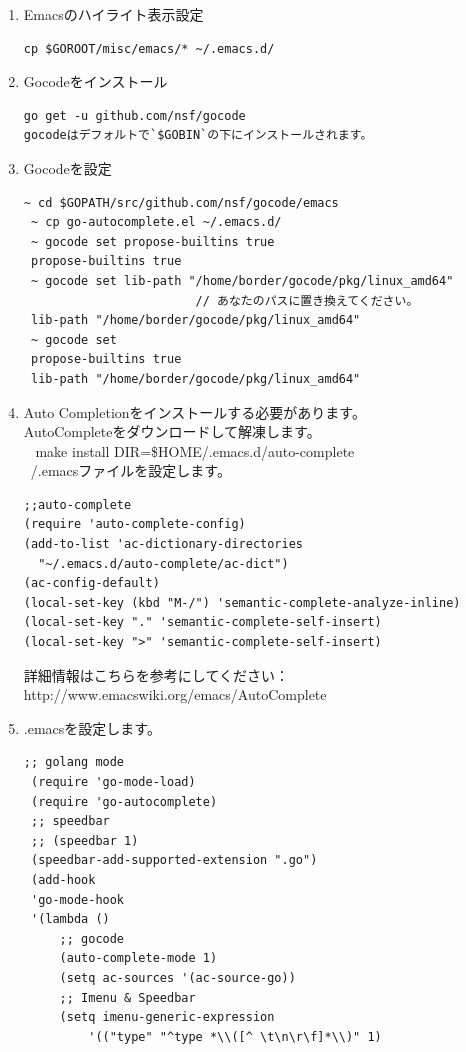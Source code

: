 \begin{enumerate}
\item Emacsのハイライト表示設定
\begin{lstlisting}[numbers=none]
cp $GOROOT/misc/emacs/* ~/.emacs.d/
\end{lstlisting}
\item Gocodeをインストール
\begin{lstlisting}[numbers=none]
go get -u github.com/nsf/gocode
gocodeはデフォルトで`$GOBIN`の下にインストールされます。
\end{lstlisting}
\item Gocodeを設定
\begin{lstlisting}[numbers=none]
 ~ cd $GOPATH/src/github.com/nsf/gocode/emacs
 ~ cp go-autocomplete.el ~/.emacs.d/
 ~ gocode set propose-builtins true
 propose-builtins true
 ~ gocode set lib-path "/home/border/gocode/pkg/linux_amd64"
                        // あなたのパスに置き換えてください。
 lib-path "/home/border/gocode/pkg/linux_amd64"
 ~ gocode set
 propose-builtins true
 lib-path "/home/border/gocode/pkg/linux_amd64"
\end{lstlisting}
\item Auto Completionをインストールする必要があります。\\ AutoCompleteをダウンロードして解凍します。\\ ~ make install DIR=\$HOME\//.emacs.d\//auto-complete\\ ~\//.emacsファイルを設定します。
\begin{lstlisting}[numbers=none]
;;auto-complete
(require 'auto-complete-config)
(add-to-list 'ac-dictionary-directories
  "~/.emacs.d/auto-complete/ac-dict")
(ac-config-default)
(local-set-key (kbd "M-/") 'semantic-complete-analyze-inline)
(local-set-key "." 'semantic-complete-self-insert)
(local-set-key ">" 'semantic-complete-self-insert)
\end{lstlisting}
詳細情報はこちらを参考にしてください：http://www.emacswiki.org/emacs/AutoComplete
\item .emacsを設定します。
\begin{lstlisting}[numbers=none]
 ;; golang mode
 (require 'go-mode-load)
 (require 'go-autocomplete)
 ;; speedbar
 ;; (speedbar 1)
 (speedbar-add-supported-extension ".go")
 (add-hook
 'go-mode-hook
 '(lambda ()
     ;; gocode
     (auto-complete-mode 1)
     (setq ac-sources '(ac-source-go))
     ;; Imenu & Speedbar
     (setq imenu-generic-expression
         '(("type" "^type *\\([^ \t\n\r\f]*\\)" 1)

\end{lstlisting}
\end{enumerate}
